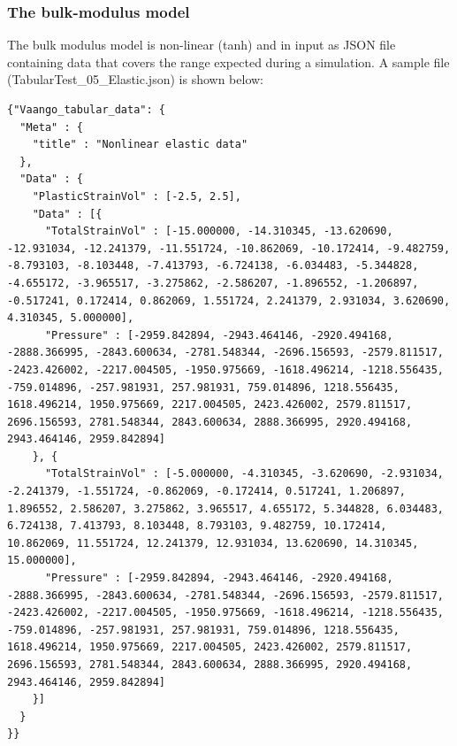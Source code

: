 \subsubsection{The bulk-modulus model}
The bulk modulus model is non-linear (\textsf{tanh}) and in input as JSON file containing data
that covers the range expected during a simulation.  A sample file  
(\textsf{TabularTest\_05\_Elastic.json}) is shown below:
\lstset{
  language=JSON
}
\begin{lstlisting}
{"Vaango_tabular_data": {
  "Meta" : {
    "title" : "Nonlinear elastic data"
  },
  "Data" : {
    "PlasticStrainVol" : [-2.5, 2.5],
    "Data" : [{
      "TotalStrainVol" : [-15.000000, -14.310345, -13.620690, -12.931034, -12.241379, -11.551724, -10.862069, -10.172414, -9.482759, -8.793103, -8.103448, -7.413793, -6.724138, -6.034483, -5.344828, -4.655172, -3.965517, -3.275862, -2.586207, -1.896552, -1.206897, -0.517241, 0.172414, 0.862069, 1.551724, 2.241379, 2.931034, 3.620690, 4.310345, 5.000000],
      "Pressure" : [-2959.842894, -2943.464146, -2920.494168, -2888.366995, -2843.600634, -2781.548344, -2696.156593, -2579.811517, -2423.426002, -2217.004505, -1950.975669, -1618.496214, -1218.556435, -759.014896, -257.981931, 257.981931, 759.014896, 1218.556435, 1618.496214, 1950.975669, 2217.004505, 2423.426002, 2579.811517, 2696.156593, 2781.548344, 2843.600634, 2888.366995, 2920.494168, 2943.464146, 2959.842894]
    }, {
      "TotalStrainVol" : [-5.000000, -4.310345, -3.620690, -2.931034, -2.241379, -1.551724, -0.862069, -0.172414, 0.517241, 1.206897, 1.896552, 2.586207, 3.275862, 3.965517, 4.655172, 5.344828, 6.034483, 6.724138, 7.413793, 8.103448, 8.793103, 9.482759, 10.172414, 10.862069, 11.551724, 12.241379, 12.931034, 13.620690, 14.310345, 15.000000],
      "Pressure" : [-2959.842894, -2943.464146, -2920.494168, -2888.366995, -2843.600634, -2781.548344, -2696.156593, -2579.811517, -2423.426002, -2217.004505, -1950.975669, -1618.496214, -1218.556435, -759.014896, -257.981931, 257.981931, 759.014896, 1218.556435, 1618.496214, 1950.975669, 2217.004505, 2423.426002, 2579.811517, 2696.156593, 2781.548344, 2843.600634, 2888.366995, 2920.494168, 2943.464146, 2959.842894]
    }]
  }
}}
\end{lstlisting}

